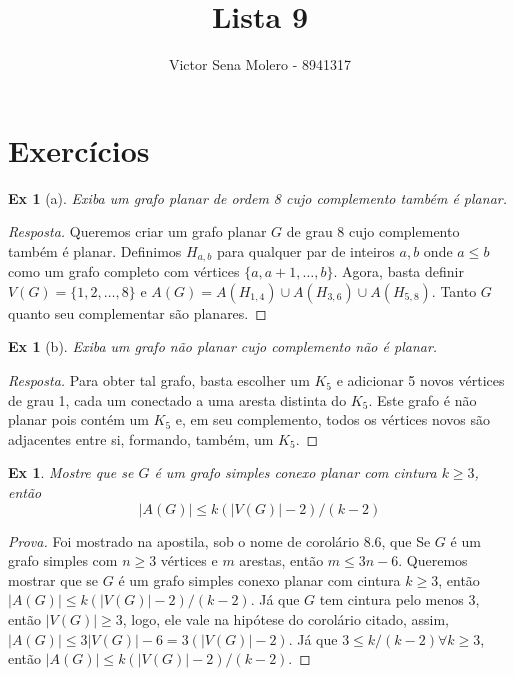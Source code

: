 \documentclass[12pt]{article}
\newcounter{exCounter}
\newtheorem{ex}[exCounter]{Ex}
\begin{document}
 
 
\title{Lista 9}
\author{Victor Sena Molero - 8941317}
\maketitle

\section{Exercícios}
\begin{ex}[a]
Exiba um grafo planar de ordem 8 cujo complemento também é planar.
\end{ex}
\setcounter{exCounter}{31}

\begin{proof}[Resposta]
Queremos criar um grafo planar $G$ de grau 8 cujo complemento também é planar. Definimos $H_{a,b}$ para qualquer par de inteiros $a,b$ onde $a \leq b$ como um grafo completo com vértices $\{a,a+1,\dots,b\}$. Agora, basta definir $V(G) = \{1,2,\dots,8\}$ e $A(G) = A(H_{1,4}) \cup A(H_{3,6}) \cup A(H_{5,8})$. Tanto $G$ quanto seu complementar são planares.
\end{proof}

\begin{ex}[b]
Exiba um grafo não planar cujo complemento não é planar.
\end{ex}

\begin{proof}[Resposta]
Para obter tal grafo, basta escolher um $K_5$ e adicionar 5 novos vértices de grau 1, cada um conectado a uma aresta distinta do $K_5$. Este grafo é não planar pois contém um $K_5$ e, em seu complemento, todos os vértices novos são adjacentes entre si, formando, também, um $K_5$.
\end{proof}

\begin{ex}
Mostre que se $G$ é um grafo simples conexo planar com cintura $k \geq 3$, então
$$ |A(G)| \leq k(|V(G)| - 2)/(k-2) $$
\end{ex}

\begin{proof}[Prova]
Foi mostrado na apostila, sob o nome de corolário 8.6, que Se $G$ é um grafo simples com $n \geq 3$ vértices e $m$ arestas, então $m \leq 3n - 6$. Queremos mostrar que se $G$ é um grafo simples conexo planar com cintura $k \geq 3$, então $ |A(G)| \leq k(|V(G)| - 2)/(k-2) $. Já que $G$ tem cintura pelo menos 3, então $|V(G)| \geq 3$, logo, ele vale na hipótese do corolário citado, assim, $|A(G)| \leq 3|V(G)| - 6 = 3(|V(G)| - 2)$. Já que $3 \leq k/(k-2) \forall k \geq 3$, então $|A(G)| \leq k(|V(G)| - 2)/(k-2)$.
\end{proof}
\end{document}
